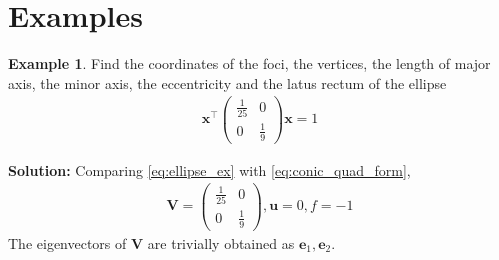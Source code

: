 \documentclass[]{interact}
\theoremstyle{plain}%
\theoremstyle{definition}
\newtheorem{example}[theorem]{Example}
\theoremstyle{remark}
\providecommand{\abs}[1]{\lvert#1\rvert}
\newcommand{\myvec}[1]{\ensuremath{\begin{pmatrix}#1\end{pmatrix}}}
\newcommand{\mydet}[1]{\ensuremath{\begin{vmatrix}#1\end{vmatrix}}}
\newcommand{\solution}{\noindent \textbf{Solution: }}
\let\vec\mathbf
\begin{document}

\section{Examples}

\begin{example}
  Find the coordinates of the foci, the vertices, the length of major axis, the minor axis, the eccentricity and the latus rectum of the ellipse 
  \begin{align}
    \label{eq:ellipse_ex}
  \vec{x}^{\top}\myvec{\frac{1}{25} & 0 \\ 0 & \frac{1}{9}}\vec{x} = 1
  \end{align}
  \end{example}
  \solution Comparing   \eqref{eq:ellipse_ex} with     \eqref{eq:conic_quad_form},
  \begin{align}
    \vec{V} =  \myvec{\frac{1}{25} & 0 \\ 0 & \frac{1}{9}}, \vec{u} = 0, f = -1
  \end{align}
  The eigenvectors of $\vec{V}$ are trivially obtained as $\vec{e}_1,\vec{e}_2$.
  

%

\end{document}
